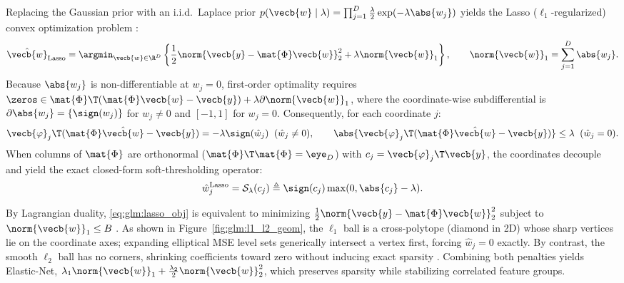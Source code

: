 \documentclass[../../../../master.tex]{subfiles}
\begin{document}
\begin{coremath}
Replacing the Gaussian prior with an i.i.d.\ Laplace prior $p(\vecb{w} \mid \lambda) = \prod_{j=1}^D \frac{\lambda}{2}\exp(-\lambda\abs{w_j})$ yields the Lasso ($\ell_1$-regularized) convex optimization problem :
\begin{equation}
\label{eq:glm:lasso_obj}
\hat{\vecb{w}}_{\mathrm{Lasso}} = \argmin_{\vecb{w}\in\R^D} \left\{\frac{1}{2}\norm{\vecb{y} - \mat{\Phi}\vecb{w}}_2^2 + \lambda\norm{\vecb{w}}_1\right\}, \qquad \norm{\vecb{w}}_1 = \sum_{j=1}^D \abs{w_j}.
\end{equation}
Because $\abs{w_j}$ is non-differentiable at $w_j = 0$, first-order optimality requires $\zeros \in \mat{\Phi}\T(\mat{\Phi}\vecb{w} - \vecb{y}) + \lambda\partial\norm{\vecb{w}}_1$, where the coordinate-wise subdifferential is $\partial\abs{w_j} = \{\sign(w_j)\}$ for $w_j \neq 0$ and $[-1, 1]$ for $w_j = 0$. Consequently, for each coordinate $j$:
\begin{equation}
\label{eq:glm:lasso_kkt}
\vecb{\varphi}_j\T(\mat{\Phi}\hat{\vecb{w}} - \vecb{y}) = -\lambda\sign(\hat{w}_j) \;\; (\hat{w}_j \neq 0), \qquad
\abs{\vecb{\varphi}_j\T(\mat{\Phi}\hat{\vecb{w}} - \vecb{y})} \le \lambda \;\; (\hat{w}_j = 0).
\end{equation}
When columns of $\mat{\Phi}$ are orthonormal ($\mat{\Phi}\T\mat{\Phi} = \eye_D$) with $c_j = \vecb{\varphi}_j\T\vecb{y}$, the coordinates decouple and yield the exact closed-form soft-thresholding operator:
\begin{equation}
\label{eq:glm:soft_thresh}
\hat{w}_j^{\mathrm{Lasso}} = \mathcal{S}_\lambda(c_j) \triangleq \sign(c_j)\max(0, \abs{c_j} - \lambda).
\end{equation}
\end{coremath}

By Lagrangian duality, \eqref{eq:glm:lasso_obj} is equivalent to minimizing $\frac{1}{2}\norm{\vecb{y}-\mat{\Phi}\vecb{w}}_2^2$ subject to $\norm{\vecb{w}}_1 \le B$ . As shown in Figure~\ref{fig:glm:l1_l2_geom}, the $\ell_1$ ball is a cross-polytope (diamond in 2D) whose sharp vertices lie on the coordinate axes; expanding elliptical MSE level sets generically intersect a vertex first, forcing $\hat{w}_j = 0$ exactly. By contrast, the smooth $\ell_2$ ball has no corners, shrinking coefficients toward zero without inducing exact sparsity . Combining both penalties yields Elastic-Net, $\lambda_1\norm{\vecb{w}}_1 + \frac{\lambda_2}{2}\norm{\vecb{w}}_2^2$, which preserves sparsity while stabilizing correlated feature groups.
\end{document}
